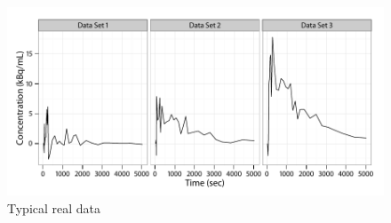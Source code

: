 \begin{figure}[t]
  \UseAltLinespread
  \includegraphics[width=\linewidth]{fig_src/Typical_PET}
  \caption{Typical real \protect\pet data}
  \label{fig:typical real pet}
\end{figure}
